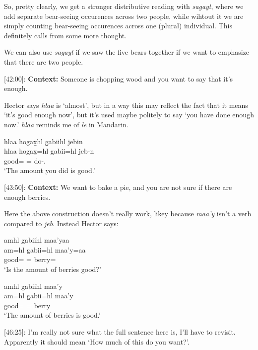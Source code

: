 So, pretty clearly, we get a stronger distributive reading with \textit{sag̱ayt}, where we add separate bear-seeing occurences across two people, while wihtout it we are simply counting bear-seeing occurences across one (plural) individual. This definitely calls from some more thought.

We can also use \textit{sag̱ayt} if we saw the five bears together if we want to emphasize that there are two people. 

[42:00]: \textbf{Context:} Someone is chopping wood and you want to say that it's enough. 

Hector says \textit{hlaa} is `almost', but in a way this may reflect the fact that it means `it's good enough now', but it's used maybe politely to say `you have done enough now.' \textit{hlaa} reminds me of \textit{le} in Mandarin.

\begin{exe}
    \ex \glll hlaa hogax̱hl g̱abiihl jebin  \\
    hlaa hogax̱=hl g̱abii=hl jeb-n   \\
    \Incep{} good=\Cn{} \Cnt{}=\Cn{} do-\Ssg{}.\Ii{} \\
    `The amount you did is good.'
\end{exe}

[43:50]: \textbf{Context:} We want to bake a pie, and you are not sure if there are enough berries. 

Here the above construction doesn't really work, likey because \textit{maa'y} isn't a verb compared to \textit{jeb}. Instead Hector says:

\begin{exe}
    \ex
    \begin{exe}
        \item \glll amhl g̱abiihl maa'yaa  \\
    am=hl g̱abii=hl maa'y=aa   \\
    good=\Cn{} \Cnt{}=\Cn{} berry=\Q{} \\
    `Is the amount of berries good?'
    \item \glll amhl g̱abiihl maa'y  \\
    am=hl g̱abii=hl maa'y   \\
    good=\Cn{} \Cnt{}=\Cn{} berry \\
    `The amount of berries is good.'
    \end{exe}
\end{exe}

[46:25]: I'm really not sure what the full sentence here is, I'll have to revisit. Apparently it should mean `How much of this do you want?'.

